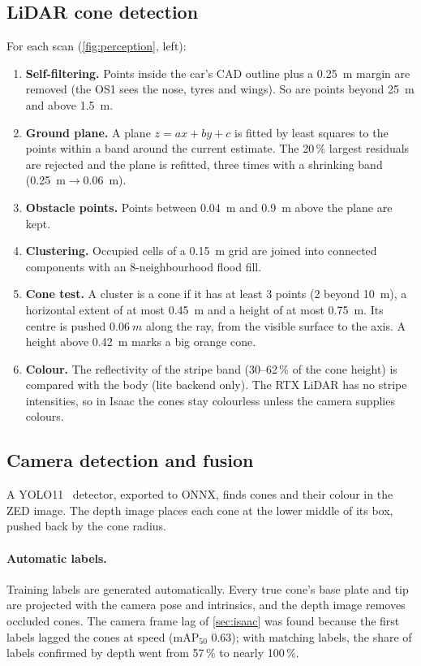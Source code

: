 \documentclass[11pt]{article}
\begin{document}
\subsection{LiDAR cone detection}
For each scan (\cref{fig:perception}, left):
\begin{enumerate}
  \item \textbf{Self-filtering.} Points inside the car's CAD outline plus a \SI{0.25}{m} margin are removed (the
        OS1 sees the nose, tyres and wings). So are points beyond \SI{25}{m} and above \SI{1.5}{m}.
  \item \textbf{Ground plane.} A plane $z=ax+by+c$ is fitted by least squares to the points within a band around
        the current estimate. The 20\,\% largest residuals are rejected and the plane is refitted, three times with
        a shrinking band (\SI{0.25}{m}$\to$\SI{0.06}{m}).
  \item \textbf{Obstacle points.} Points between \SI{0.04}{m} and \SI{0.9}{m} above the plane are kept.
  \item \textbf{Clustering.} Occupied cells of a \SI{0.15}{m} grid are joined into connected components with an
        8-neighbourhood flood fill.
  \item \textbf{Cone test.} A cluster is a cone if it has at least 3 points (2 beyond \SI{10}{m}), a horizontal
        extent of at most \SI{0.45}{m} and a height of at most \SI{0.75}{m}. Its centre is pushed
        $\SI{0.06}{m}$ along the ray, from the visible surface to the axis. A height above \SI{0.42}{m} marks a big
        orange cone.
  \item \textbf{Colour.} The reflectivity of the stripe band (30--62\,\% of the cone height) is compared with the
        body (lite backend only). The RTX LiDAR has no stripe intensities, so in Isaac the cones stay colourless
        unless the camera supplies colours.
\end{enumerate}

\subsection{Camera detection and fusion}
A YOLO11~\cite{yolo11} detector, exported to ONNX, finds cones and their colour in the ZED image. The depth image
places each cone at the lower middle of its box, pushed back by the cone radius.

\paragraph{Automatic labels.} Training labels are generated automatically. Every true cone's base plate and tip
are projected with the camera pose and intrinsics, and the depth image removes occluded cones. The camera frame
lag of \cref{sec:isaac} was found because the first labels lagged the cones at speed (mAP$_{50}$ 0.63); with
matching labels, the share of labels confirmed by depth went from 57\,\% to nearly 100\,\%.
\end{document}
